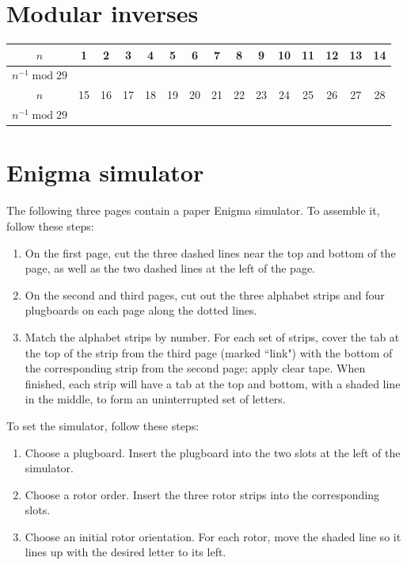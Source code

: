 \documentclass{book}
\theoremstyle{plain}
\theoremstyle{definition}
\renewcommand{\mod}{\operatorname{mod}}
\renewcommand{\mod}{\operatorname{mod}}
\begin{document}
\chapter{Modular inverses}
\label{app:inverses}
\begin{center}
\def\arraystretch{1.5}
\begin{tabular}{|c|c|c|c|c|c|c|c|c|c|c|c|c|c|c|}
\hline
$n$ & 1 & 2 & 3 & 4 & 5 & 6 & 7 & 8 & 9 & 10 & 11 & 12 & 13 & 14 \\
\hline
$n^{-1} \mod 29$ & & & & & & & & & & & & & & \\
\hline
$n$ & 15 & 16 & 17 & 18 & 19 & 20 & 21 & 22 & 23 & 24 & 25 & 26 & 27 & 28 \\
\hline
$n^{-1} \mod 29$ & & & & & & & & & & & & & & \\
\hline
\end{tabular}
\def\arraystretch{1.0}
\end{center}

\chapter{Enigma simulator}
\label{app:enigma}
The following three pages contain a paper Enigma simulator. To assemble it, follow these steps:
\begin{enumerate}
\item On the first page, cut the three dashed lines near the top and bottom of the page, as well as the two dashed lines at the left of the page.
\item On the second and third pages, cut out the three alphabet strips and four plugboards on each page along the dotted lines.
\item Match the alphabet strips by number. For each set of strips, cover the tab at the top of the strip from the third page (marked ``link") with the bottom of the corresponding strip from the second page; apply clear tape. When finished, each strip will have a tab at the top and bottom, with a shaded line in the middle, to form an uninterrupted set of letters.
\end{enumerate}

To set the simulator, follow these steps:
\begin{enumerate}
\item Choose a plugboard. Insert the plugboard into the two slots at the left of the simulator.
\item Choose a rotor order. Insert the three rotor strips into the corresponding slots.
\item Choose an initial rotor orientation. For each rotor, move the shaded line so it lines up with the desired letter to its left.
\end{enumerate}
\end{document}
